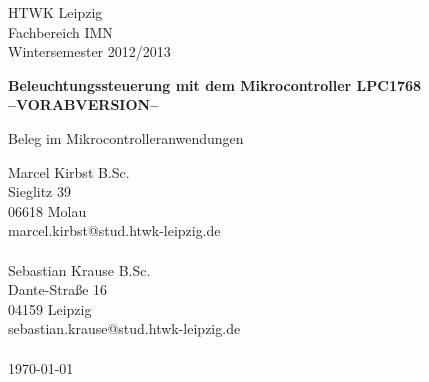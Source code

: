 \documentclass[a4paper,12pt]{scrartcl}
\begin{document}

\begin{titlepage}
\thispagestyle{htwkheader}		
HTWK Leipzig\\
Fachbereich IMN \\
Wintersemester 2012/2013




\begin{center}
\begin{Large}
\vfill {\textsf{\textbf{
Beleuchtungssteuerung mit dem Mikrocontroller LPC1768
\\--VORABVERSION--\\
}}}
\end{Large}
Beleg im Mikrocontrolleranwendungen
\end{center}

\begin{small}
\vfill
Marcel Kirbst B.Sc.\\
Sieglitz 39 \\
06618 Molau \\
marcel.kirbst@stud.htwk-leipzig.de\\
\\
Sebastian Krause B.Sc.\\
Dante-Stra\ss{}e 16 \\
04159 Leipzig \\
sebastian.krause@stud.htwk-leipzig.de\\
\\
\today
\end{small}

\end{titlepage}
\addtolength{\voffset}{-2cm}
\end{document}
